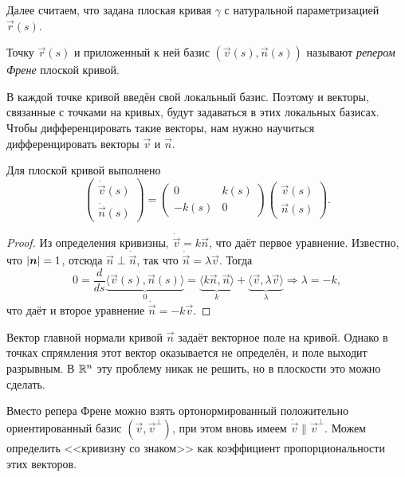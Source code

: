 Далее считаем, что задана плоская кривая $\gamma$ с натуральной параметризацией $\vec{r}(s)$.

\begin{definition}
	Точку $\vec{r}(s)$ и приложенный к ней базис $(\vec{v}(s), \vec{n}(s))$ называют \textit{репером Френе} плоской кривой.
\end{definition}

В каждой точке кривой введён свой локальный базис. Поэтому и векторы, связанные с точками на кривых, будут задаваться в этих локальных базисах. Чтобы дифференцировать такие векторы, нам нужно научиться дифференцировать векторы $\vec{v}$ и $\vec{n}$.

\begin{theorem}
	Для плоской кривой выполнено
	\begin{equation} \label{eq:PlaneFrenet}
		\begin{pmatrix}
			\dot{\vec{v}}(s)\\
			\dot{\vec{n}}(s)
		\end{pmatrix} = 
		\begin{pmatrix}
			0 & k(s)\\
			-k(s) & 0
		\end{pmatrix}
		\begin{pmatrix}
			\vec{v}(s)\\
			\vec{n}(s)
		\end{pmatrix}.
	\end{equation}
\end{theorem}

\begin{proof}
	Из определения кривизны, $\dot{\vec{v}} = k\vec{n}$, что даёт первое уравнение. Известно, что $\left\lvert\boldsymbol{n}\right\rvert = 1$, отсюда $\vec{n} \perp \dot{\vec{n}}$, так что $\dot{\vec{n}} = \lambda\vec{v}$. Тогда
	\[
		0 = \frac{d}{ds}\underbrace{\langle \vec{v}(s), \vec{n}(s)\rangle}_{0} = \underbrace{\langle k\vec{n}, \vec{n}\rangle}_{k} + \underbrace{\langle \vec{v}, \lambda\vec{v} \rangle}_{\lambda} \Rightarrow \lambda = -k,
	\]
	что даёт и второе уравнение $\dot{\vec{n}} = -k\vec{v}$.
\end{proof}

Вектор главной нормали кривой $\vec{n}$ задаёт векторное поле на кривой. Однако в точках спрямления этот вектор оказывается не определён, и поле выходит разрывным. В $\mathbb{R}^n$ эту проблему никак не решить, но в плоскости это можно сделать.

Вместо репера Френе можно взять ортонормированный положительно ориентированный базис $(\vec{v}, \vec{v}^{\perp})$, при этом вновь имеем $\dot{\vec{v}} \parallel \vec{v}^{\perp}$. Можем определить <<кривизну со знаком>> как коэффициент пропорциональности этих векторов.

